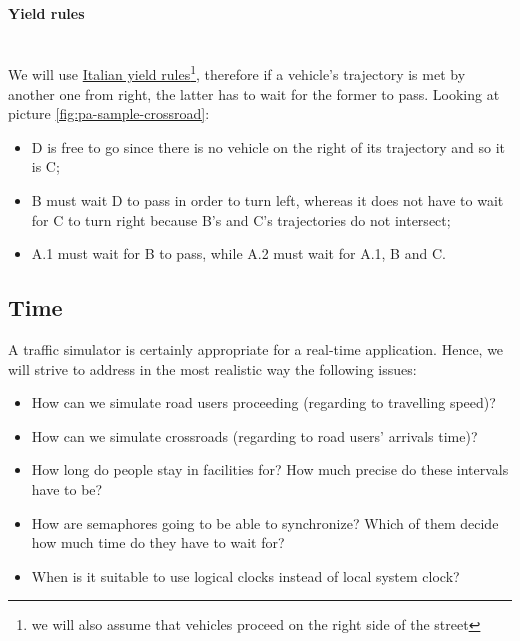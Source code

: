 \paragraph{Yield rules} \mbox{} \\

We will use \href{http://www.aci.it/i-servizi/normative/codice-della-strada/titolo-v-norme-di-comportamento/art-145-precedenza.html}{Italian yield rules}\footnote{we will also assume that vehicles proceed on the right side of the
street}, therefore if a vehicle's trajectory is met by another one from right,
the latter has to wait for the former to pass.
Looking at picture \ref{fig:pa-sample-crossroad}:
\begin{itemize}
    \item D is free to go since there is no vehicle on the right of its trajectory and so it is C;
    \item B must wait D to pass in order to turn left, whereas it does not have to wait
for C to turn right because B's and C's trajectories do not intersect;
    \item A.1 must wait for B to pass, while A.2 must wait for A.1, B and C.
\end{itemize}


\subsection{Time}\label{sec:pa-time-problems}
A traffic simulator is certainly appropriate for a real-time application.
Hence, we will strive to address in the most realistic way the following
issues:

\begin{itemize}
\item How can we simulate road users proceeding (regarding to travelling
  speed)?
\item How can we simulate crossroads (regarding to road users' arrivals time)?
\item How long do people stay in facilities for? How much precise do these
  intervals have to be?
\item How are semaphores going to be able to synchronize? Which of them decide
  how much time do they have to wait for?
\item When is it suitable to use logical clocks instead of local system clock?
\end{itemize}
